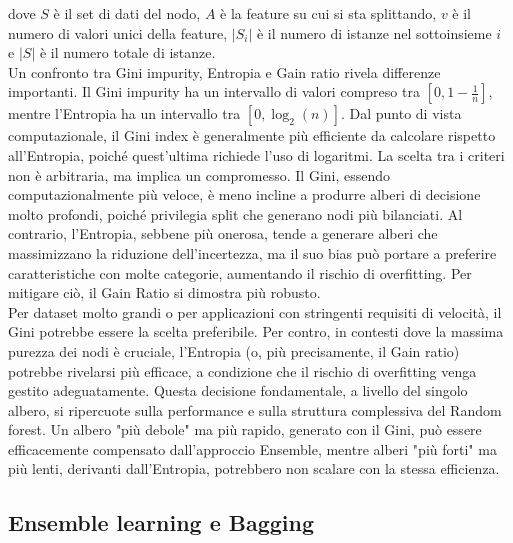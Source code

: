 \documentclass[a4paper,12pt]{report}
\begin{document}
	dove $S$ è il set di dati del nodo, $A$ è la feature su cui si sta splittando, $v$ è il numero di valori unici della feature, $|S_i|$ è il numero di istanze nel sottoinsieme $i$ e $|S|$ è il numero totale di istanze. \\
	Un confronto tra Gini impurity, Entropia e Gain ratio rivela differenze importanti. Il Gini impurity ha un intervallo di valori compreso tra $[0, 1 - \frac{1}{n}]$, mentre l'Entropia ha un intervallo tra $[0, \log_2(n)]$. Dal punto di vista computazionale, il Gini index è generalmente più efficiente da calcolare rispetto all'Entropia, poiché quest'ultima richiede l'uso di logaritmi. La scelta tra i criteri non è arbitraria, ma implica un compromesso. Il Gini, essendo computazionalmente più veloce, è meno incline a produrre alberi di decisione molto profondi, poiché privilegia split che generano nodi più bilanciati. Al contrario, l'Entropia, sebbene più onerosa, tende a generare alberi che massimizzano la riduzione dell'incertezza, ma il suo bias può portare a preferire caratteristiche con molte categorie, aumentando il rischio di overfitting. Per mitigare ciò, il Gain Ratio si dimostra più robusto. \\
	Per dataset molto grandi o per applicazioni con stringenti requisiti di velocità, il Gini potrebbe essere la scelta preferibile. Per contro, in contesti dove la massima purezza dei nodi è cruciale, l'Entropia (o, più precisamente, il Gain ratio) potrebbe rivelarsi più efficace, a condizione che il rischio di overfitting venga gestito adeguatamente. Questa decisione fondamentale, a livello del singolo albero, si ripercuote sulla performance e sulla struttura complessiva del Random forest. Un albero "più debole" ma più rapido, generato con il Gini, può essere efficacemente compensato dall'approccio Ensemble, mentre alberi "più forti" ma più lenti, derivanti dall'Entropia, potrebbero non scalare con la stessa efficienza.
	
	\subsection{Ensemble learning e Bagging}
	
\end{document}
